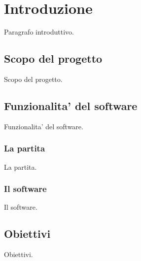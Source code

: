 
\section*{Introduzione}
%
\label{sec:introduzione}

Paragrafo introduttivo.

\subsection*{Scopo del progetto}
%
\label{sec:scopo_del_progetto}

Scopo del progetto.

\subsection*{Funzionalita' del software}
%
\label{sec:funzionalita_del_software}

Funzionalita' del software.

\subsubsection*{La partita}
%
\label{sec:partita}

La partita.

\subsubsection*{Il software}
%
\label{sec:software}

Il software.

\subsection*{Obiettivi}
%
\label{sec:obiettivi}

Obiettivi.